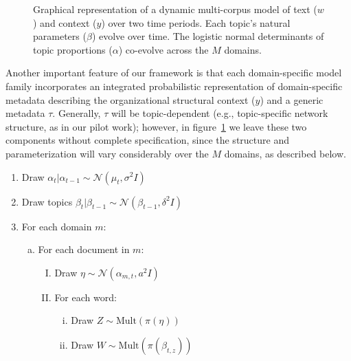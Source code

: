 \begin{figure}
\begin{center}
\end{center}
\vspace{-.3cm}
\caption{Graphical representation of a dynamic multi-corpus model of text ($w$) and context ($y$) over two time periods. Each topic's natural parameters ($\beta$) evolve over time. The logistic normal determinants of topic proportions ($\alpha$) co-evolve across the $M$ domains.}
\vspace{-.5cm}

\label{plates}


\vspace{-1.6cm}
\end{figure}


Another important feature of our framework is that each
domain-specific model family incorporates an integrated probabilistic
representation of domain-specific metadata describing the
organizational structural context ($y$) and a generic metadata
$\tau$. Generally, $\tau$ will be topic-dependent (e.g.,
topic-specific network structure, as in our pilot work); however, in
figure~\ref{plates} we leave these two components without complete
specification, since the structure and parameterization
will vary considerably over the $M$ domains, as described below. \vspace{.1cm}

\begin{enumerate}
\item Draw $\alpha_t | \alpha_{t-1} \sim  \mathcal{N}(\mu_t,\sigma^2I)$
\item Draw topics $\beta_t|\beta_{t-1}\sim \mathcal{N}\left(\beta_{t-1},\delta^2I \right)$
\item For each domain $m$:
\begin{enumerate}[a.]
\item For each document in $m$:
\begin{enumerate}[I.]
\item  Draw $\eta \sim \mathcal{N}\left(\alpha_{m,t},a^2I \right)$
\item For each word:
\begin{enumerate}[i.]
\item Draw $Z \sim \text{Mult}(\pi(\eta))$
\item Draw $W \sim \text{Mult}(\pi(\beta_{t,z}))$
\end{enumerate}


\end{enumerate}
\end{enumerate}
\end{enumerate}

